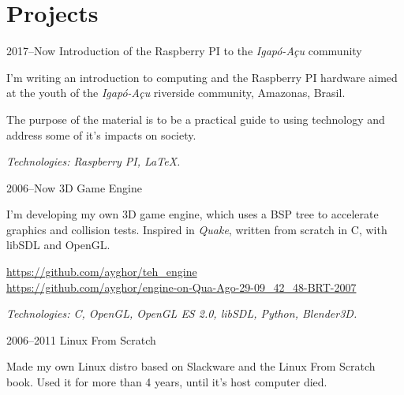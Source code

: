 \documentclass[a4paper]{simplecv}
\begin{document}
\section{Projects}

\begin{topic}
%
%
%

\item[2017--Now] Introduction of the Raspberry PI to the \emph{Igapó-Açu} community

	I'm writing an introduction to computing and the Raspberry PI hardware
	aimed at the youth of the \emph{Igapó-Açu} riverside community,
	Amazonas, Brasil.

	The purpose of the material is to be a practical guide to using
	technology and address some of it's impacts on society.

	{\em\scriptsize Technologies: Raspberry PI, \LaTeX{}.}

\item[2006--Now] 3D Game Engine

	I'm developing my own 3D game engine, which uses a BSP tree to
	accelerate graphics and collision tests. Inspired in \emph{Quake},
	written from scratch in C, with libSDL and OpenGL.

	{\scriptsize\url{https://github.com/ayghor/teh_engine}}\\
	{\scriptsize\url{https://github.com/ayghor/engine-on-Qua-Ago-29-09\_42\_48-BRT-2007}}

	{\em\scriptsize Technologies: C, OpenGL, OpenGL ES 2.0, libSDL, Python,
	Blender3D.}

%
%

\item[2006--2011] Linux From Scratch

	Made my own Linux distro based on Slackware and the Linux From Scratch
	book. Used it for more than 4 years, until it's host computer died.


\end{topic}
\end{document}
